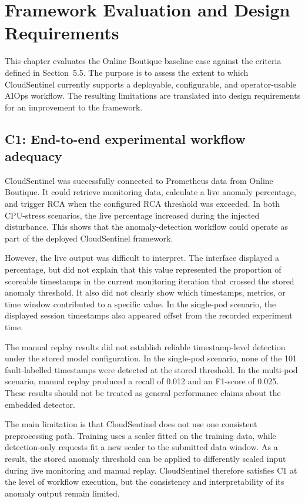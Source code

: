 \chapter{Framework Evaluation and Design Requirements}
\label{ch:framework_evaluation_and_design_requirements}
This chapter evaluates the Online Boutique baseline case against the criteria defined in Section~5.5. The purpose is to assess the extent to which CloudSentinel currently supports a deployable, configurable, and operator-usable AIOps workflow. The resulting limitations are translated into design requirements for an improvement to the framework.

\section{C1: End-to-end experimental workflow adequacy}
CloudSentinel was successfully connected to Prometheus data from Online Boutique. It could retrieve monitoring data, calculate a live anomaly percentage, and trigger RCA when the configured RCA threshold was exceeded. In both CPU-stress scenarios, the live percentage increased during the injected disturbance. This shows that the anomaly-detection workflow could operate as part of the deployed CloudSentinel framework.

However, the live output was difficult to interpret. The interface displayed a percentage, but did not explain that this value represented the proportion of scoreable timestamps in the current monitoring iteration that crossed the stored anomaly threshold. It also did not clearly show which timestamps, metrics, or time window contributed to a specific value. In the single-pod scenario, the displayed session timestamps also appeared offset from the recorded experiment time.

The manual replay results did not establish reliable timestamp-level detection under the stored model configuration. In the single-pod scenario, none of the 101 fault-labelled timestamps were detected at the stored threshold. In the multi-pod scenario, manual replay produced a recall of 0.012 and an F1-score of 0.025. These results should not be treated as general performance claims about the embedded detector.

The main limitation is that CloudSentinel does not use one consistent preprocessing path. Training uses a scaler fitted on the training data, while detection-only requests fit a new scaler to the submitted data window. As a result, the stored anomaly threshold can be applied to differently scaled input during live monitoring and manual replay. CloudSentinel therefore satisfies C1 at the level of workflow execution, but the consistency and interpretability of its anomaly output remain limited.

